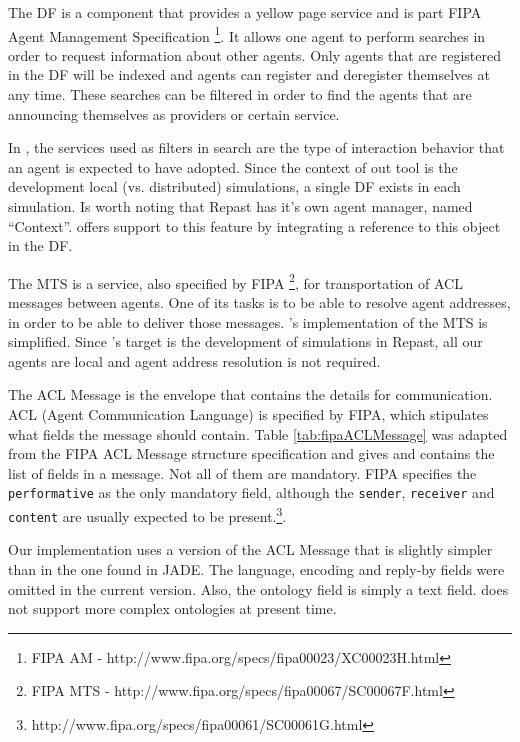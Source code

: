 The DF is a component that provides a yellow page service and is part FIPA Agent Management Specification \footnote{FIPA AM - http://www.fipa.org/specs/fipa00023/XC00023H.html}. It allows one agent to perform searches in order to request information about other agents. Only agents that are registered in the DF will be indexed and agents can register and deregister themselves at any time. These searches can be filtered in order to find the agents that are announcing themselves as providers or certain service. 

In \apiname{}, the services used as filters in search are the type of interaction behavior that an agent is expected to have adopted. Since the context of out tool is the development local (vs. distributed) simulations, a single DF exists in each simulation. Is worth noting that Repast has it's own agent manager, named ``Context''. \apiname{} offers support to this feature by integrating a reference to this object in the DF.

The MTS is a service, also specified by FIPA \footnote{FIPA MTS - http://www.fipa.org/specs/fipa00067/SC00067F.html}, for transportation of ACL messages between agents. One of its tasks is to be able to resolve agent addresses, in order to be able to deliver those messages. \apiname{}'s implementation of the MTS is simplified. Since \apiname{}'s target is the development of simulations in Repast, all our agents are local and agent address resolution is not required.

The ACL Message is the envelope that contains the details for communication. ACL (Agent Communication Language) is specified by FIPA, which stipulates what fields the message should contain. Table \ref{tab:fipaACLMessage} was adapted from the FIPA ACL Message structure specification and gives and contains the list of fields in a message. Not all of them are mandatory. FIPA specifies the \texttt{performative} as the only mandatory field, although the \texttt{sender}, \texttt{receiver} and \texttt{content} are usually expected to be present.\footnote{http://www.fipa.org/specs/fipa00061/SC00061G.html}.

Our implementation uses a version of the ACL Message that is slightly simpler than in the one found in JADE. The language, encoding and reply-by fields were omitted in the current version. Also, the ontology field is simply a text field. \apiname{} does not support more complex ontologies at present time.

